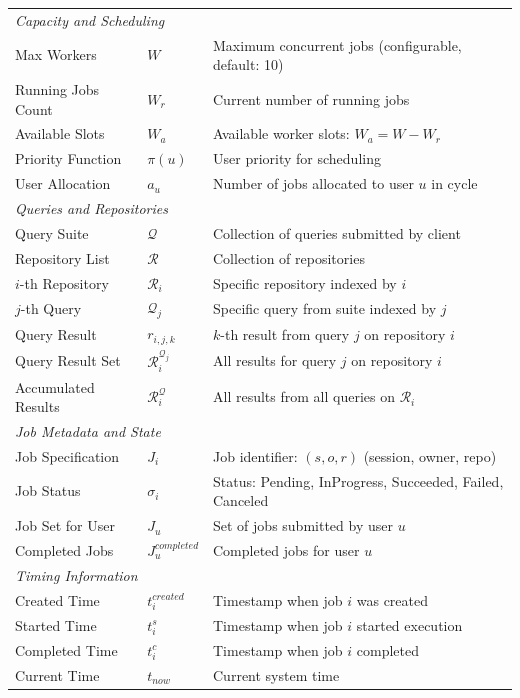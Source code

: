 \documentclass[11pt]{article}
\begin{document}
\begin{center}
\begin{longtable}{p{4cm}p{2.5cm}p{7.5cm}}
    \multicolumn{3}{l}{\textit{Capacity and Scheduling}} \\
    Max Workers & $W$ & Maximum concurrent jobs (configurable, default: 10) \\
    Running Jobs Count & $W_r$ & Current number of running jobs \\
    Available Slots & $W_a$ & Available worker slots: $W_a = W - W_r$ \\
    Priority Function & $\pi(u)$ & User priority for scheduling \\
    User Allocation & $a_u$ & Number of jobs allocated to user $u$ in cycle \\
    \midrule

    \multicolumn{3}{l}{\textit{Queries and Repositories}} \\
    Query Suite & $\mathcal{Q}$ & Collection of queries submitted by client \\
    Repository List & $\mathcal{R}$ & Collection of repositories \\
    $i$-th Repository & $\mathcal{R}_i$ & Specific repository indexed by $i$ \\
    $j$-th Query & $\mathcal{Q}_j$ & Specific query from suite indexed by $j$ \\
    Query Result & $r_{i,j,k}$ & $k$-th result from query $j$ on repository $i$ \\
    Query Result Set & $\mathcal{R}_i^{\mathcal{Q}_j}$ & All results for query $j$ on repository $i$ \\
    Accumulated Results & $\mathcal{R}_i^{\mathcal{Q}}$ & All results from all queries on $\mathcal{R}_i$ \\
    \midrule

    \multicolumn{3}{l}{\textit{Job Metadata and State}} \\
    Job Specification & $J_i$ & Job identifier: $(s, o, r)$ (session, owner, repo) \\
    Job Status & $\sigma_i$ & Status: Pending, InProgress, Succeeded, Failed, Canceled \\
    Job Set for User & $J_u$ & Set of jobs submitted by user $u$ \\
    Completed Jobs & $J_u^{completed}$ & Completed jobs for user $u$ \\
    \midrule

    \multicolumn{3}{l}{\textit{Timing Information}} \\
    Created Time & $t_i^{created}$ & Timestamp when job $i$ was created \\
    Started Time & $t_i^s$ & Timestamp when job $i$ started execution \\
    Completed Time & $t_i^c$ & Timestamp when job $i$ completed \\
    Current Time & $t_{now}$ & Current system time \\
    \midrule


\end{longtable}
\end{center}
\end{document}
